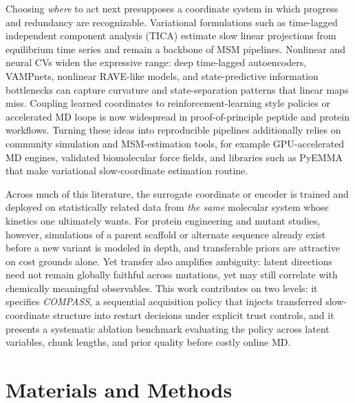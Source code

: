 Choosing \emph{where} to act next presupposes a coordinate system in which progress and redundancy are recognizable.
Variational formulations such as time-lagged independent component analysis (TICA) estimate slow linear projections from equilibrium time series and remain a backbone of MSM pipelines.\cite{perezhernandez2013tica,schwantes2013improvements,scherer2015pyemma}
Nonlinear and neural CVs widen the expressive range: deep time-lagged autoencoders,\cite{wehmeyer2018time} VAMPnets,\cite{mardt2018vampnets} nonlinear RAVE-like models,\cite{ribeiro2018rave} and state-predictive information bottlenecks\cite{tishby2000information,wang2021spib} can capture curvature and state-separation patterns that linear maps miss.\cite{noe2017collective}
Coupling learned coordinates to reinforcement-learning style policies or accelerated MD loops is now widespread in proof-of-principle peptide and protein workflows.\cite{shamsi2018reap,kleiman2022multiagent,lee2019deepdrivemd}
Turning these ideas into reproducible pipelines additionally relies on community simulation and MSM-estimation tools, for example GPU-accelerated MD engines, validated biomolecular force fields, and libraries such as PyEMMA that make variational slow-coordinate estimation routine.\cite{eastman2024openmm8,huang2017charmm36m,kim2015charmmgui,scherer2015pyemma}

Across much of this literature, the surrogate coordinate or encoder is trained and deployed on statistically related data from \emph{the same} molecular system whose kinetics one ultimately wants.
For protein engineering and mutant studies, however, simulations of a parent scaffold or alternate sequence already exist before a new variant is modeled in depth, and transferable priors are attractive on cost grounds alone.\cite{voelz2013examining,zimmerman2017prediction,pantsar2018assessment}
Yet transfer also amplifies ambiguity: latent directions need not remain globally faithful across mutations, yet may still correlate with chemically meaningful observables.
This work contributes on two levels: it specifies \emph{COMPASS}, a sequential acquisition policy that injects transferred slow-coordinate structure into restart decisions under explicit trust controls, and it presents a systematic ablation benchmark evaluating the policy across latent variables, chunk lengths, and prior quality before costly online MD.

\chapter{Materials and Methods}\label{chap:methods}

